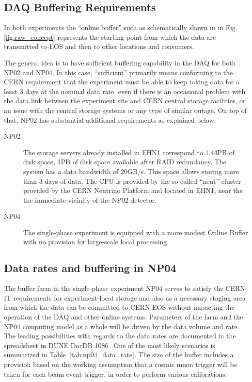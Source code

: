 \documentclass[12pt]{article}
\begin{document}
\subsection{DAQ Buffering Requirements}
\label{sec:daq_interface}
In both experiments the ``online buffer'' such as schematically shown in in Fig.\ref{fig:raw_concept} represents the starting
point from which the data are transmitted to EOS and then to other locations and consumers.

The general idea is to have sufficient buffering capability in the DAQ for both NP02 and NP04. In this case, ``sufficient''
primarily means conforming to the CERN requirement that the experiment must be able to keep taking data for a
least 3 days at the nominal data rate, even if there is an occasional problem with the data link between the
experiment site and CERN central storage facilities, or an issue with the central storage systems or any type of similar outage.
On top of that, NP02 has substantial additional requirements as explained below.
\begin{description}

\item[NP02] The storage servers already installed in EHN1  correspond to 1.44PB of disk space, 1PB of disk space available after RAID redundancy.
The system has a data bandwidth of 20GB/s.
This space allows storing more than 3 days of data.
The CPU is provided by the so-called ``neut'' cluster provided by the CERN Neutrino Platform and located in EHN1, near the the immediate vicinity of the NP02 detector.

\item[ NP04] The single-phase experiment is equipped with a more modest Online Buffer with no provision for large-scale
local processing.
\end{description}

\noindent


\subsection{Data rates and buffering in NP04}
\label{sec:np04_data_rate}
The buffer farm in the single-phase experiment NP04 serves to satisfy
the CERN IT requirements for experiment-local storage and also as a necessary
staging area from which the data can be committed to CERN EOS without impacting the operation
of the DAQ and other online systems. Parameters of the farm and the NP04 computing model
as a whole will be driven by the data volume and rate. The leading possibilities with regards to the
data rates are documented in the spreadsheet in DUNE DocDB 1086\,\cite{duneDocDb1086}.
One of the most likely scenarios is summarized in Table~\ref{tab:np04_data_rate}. The size of
the buffer includes a provision based on the working assumption that a cosmic muon trigger will
be taken for each beam event trigger, in order to perform various calibrations.
\end{document}
